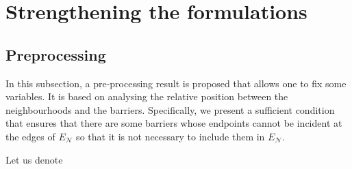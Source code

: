 \documentclass[a4paper,  review, authoryear, 1p.]{elsarticle}
\newcommand{\EN}{{E^{}_{\mathcal N}}}
\newcommand{\determinant}[3]{\det({#1|#2#3})}
\begin{document}
	
	\section{Strengthening the formulations}\label{section:strengthening}
	
	\subsection{Preprocessing}\label{subsection:preprocessing}
	In this subsection, a pre-processing result is proposed that allows one to fix some variables. It is based on analysing the relative position between the neighbourhoods and the barriers.
	Specifically, we present a sufficient condition that ensures that there are some barriers whose endpoints cannot be incident at the edges of $\EN$ so that it is not necessary to include them in $\EN$. 
	
	Let us denote
	
\end{document}
